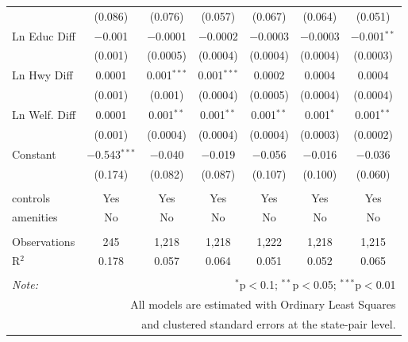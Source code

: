 \begin{table}[!htbp]
\begin{tabular}{@{\extracolsep{5pt}}lcccccc}
  & (0.086) & (0.076) & (0.057) & (0.067) & (0.064) & (0.051) \\ 
  Ln Educ Diff & $-$0.001 & $-$0.0001 & $-$0.0002 & $-$0.0003 & $-$0.0003 & $-$0.001$^{**}$ \\ 
  & (0.001) & (0.0005) & (0.0004) & (0.0004) & (0.0004) & (0.0003) \\ 
  Ln Hwy Diff & 0.0001 & 0.001$^{***}$ & 0.001$^{***}$ & 0.0002 & 0.0004 & 0.0004 \\ 
  & (0.001) & (0.001) & (0.0004) & (0.0005) & (0.0004) & (0.0004) \\ 
  Ln Welf. Diff & 0.0001 & 0.001$^{**}$ & 0.001$^{**}$ & 0.001$^{**}$ & 0.001$^{*}$ & 0.001$^{**}$ \\ 
  & (0.001) & (0.0004) & (0.0004) & (0.0004) & (0.0003) & (0.0002) \\ 
  Constant & $-$0.543$^{***}$ & $-$0.040 & $-$0.019 & $-$0.056 & $-$0.016 & $-$0.036 \\ 
  & (0.174) & (0.082) & (0.087) & (0.107) & (0.100) & (0.060) \\ 
 \hline \\[-1.8ex] 
controls & Yes & Yes & Yes & Yes & Yes & Yes \\ 
amenities & No & No & No & No & No & No \\ 
\hline \\[-1.8ex] 
Observations & 245 & 1,218 & 1,218 & 1,222 & 1,218 & 1,215 \\ 
R$^{2}$ & 0.178 & 0.057 & 0.064 & 0.051 & 0.052 & 0.065 \\ 
\hline 
\hline \\[-1.8ex] 
\textit{Note:}  & \multicolumn{6}{r}{$^{*}$p$<$0.1; $^{**}$p$<$0.05; $^{***}$p$<$0.01} \\ 
 & \multicolumn{6}{r}{All models are estimated with Ordinary Least Squares} \\ 
 & \multicolumn{6}{r}{and clustered standard errors at the state-pair level.} \\ 
\end{tabular} 
\end{table} 

